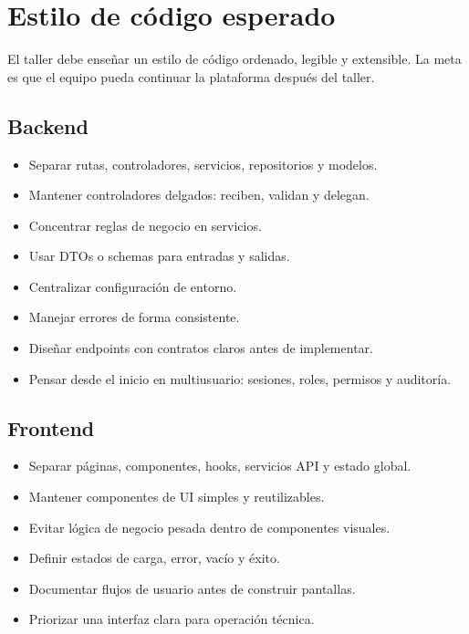 \documentclass[11pt,a4paper]{article}
\begin{document}
\section*{Estilo de código esperado}

El taller debe enseñar un estilo de código ordenado, legible y extensible. La meta es que el equipo pueda continuar la plataforma después del taller.

\subsection*{Backend}

\begin{itemize}
  \item Separar rutas, controladores, servicios, repositorios y modelos.
  \item Mantener controladores delgados: reciben, validan y delegan.
  \item Concentrar reglas de negocio en servicios.
  \item Usar DTOs o schemas para entradas y salidas.
  \item Centralizar configuración de entorno.
  \item Manejar errores de forma consistente.
  \item Diseñar endpoints con contratos claros antes de implementar.
  \item Pensar desde el inicio en multiusuario: sesiones, roles, permisos y auditoría.
\end{itemize}

\subsection*{Frontend}

\begin{itemize}
  \item Separar páginas, componentes, hooks, servicios API y estado global.
  \item Mantener componentes de UI simples y reutilizables.
  \item Evitar lógica de negocio pesada dentro de componentes visuales.
  \item Definir estados de carga, error, vacío y éxito.
  \item Documentar flujos de usuario antes de construir pantallas.
  \item Priorizar una interfaz clara para operación técnica.
\end{itemize}
\end{document}
